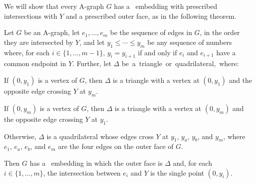 %
%

We will show that every A-graph $G$ has a \Fary\ embedding with prescribed intersections with $Y$ and a prescribed outer face, as in the following theorem. 

\begin{thm}
	Let $G$ be an A-graph, let $e_1,\ldots,e_m$ be the sequence of edges in $G$, in the order they are intersected by $Y$, and let $y_1\le\cdots\le y_m$ be any sequence of numbers where, for each $i\in\{1,\ldots,m-1\}$, $y_i=y_{i+1}$ if and only if $e_i$ and $e_{i+1}$ have a common endpoint in $Y$. Further, let $\Delta$ \mbox{be a triangle or quadrilateral, where:}
		\begin{compactenum}
			\item If $(0,y_1)$ is a vertex of $G$, then $\Delta$ is a triangle
			with a vertex at $(0,y_1)$ and the opposite edge crossing $Y$ at $y_m$.
			
			\item If $(0,y_m)$ is a vertex of $G$, then $\Delta$ is a triangle
			with a vertex at $(0,y_m)$ and the opposite edge crossing $Y$ at $y_1$.
			
			\item Otherwise, $\Delta$ is a quadrilateral whose edges cross $Y$ at $y_1$, $y_a$,
			$y_b$, and $y_m$, where $e_1$, $e_a$, $e_b$, and $e_m$ are the four edges on the outer face of $G$.
	\end{compactenum}
	Then $G$ has a
	\Fary\ embedding in which the outer face is $\Delta$
	and, for each $i\in\{1,\ldots,m\}$, the intersection between $e_i$ and $Y$
	is the single point $(0,y_i)$.
\end{thm}

